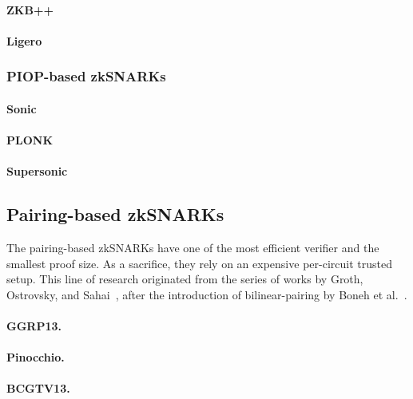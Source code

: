 \documentclass[acmtog]{acmart}
\begin{document}
\paragraph{ZKB++}

\paragraph{Ligero}

\subsubsection{PIOP-based zkSNARKs}

\paragraph{Sonic}

\paragraph{PLONK}

\paragraph{Supersonic}


\subsection{Pairing-based zkSNARKs}

The pairing-based zkSNARKs have one of the most efficient verifier and the smallest proof size.
As a sacrifice, they rely on an expensive per-circuit trusted setup.
This line of research originated from the series of works by Groth, Ostrovsky, and Sahai~\cite{GrothOS06Non, GrothOS06Perfect, Groth10}, after the introduction of bilinear-pairing by Boneh et al.~\cite{BonehF01}.

\paragraph{GGRP13.}

\paragraph{Pinocchio.}

\paragraph{BCGTV13.}
\end{document}
